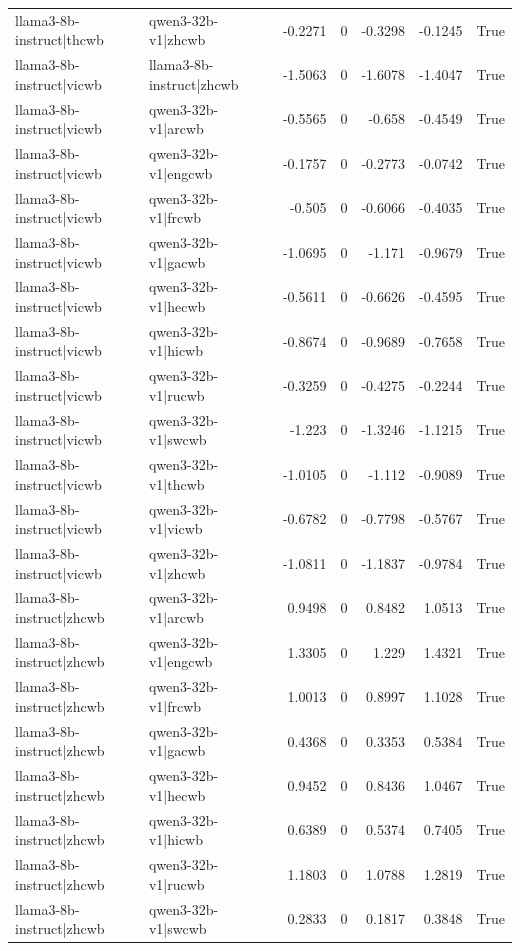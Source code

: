 \begin{table}
\begin{tabular}{l l r r r r l}
llama3-8b-instruct|thcwb & qwen3-32b-v1|zhcwb & -0.2271 & 0 & -0.3298 & -0.1245 & True \\
llama3-8b-instruct|vicwb & llama3-8b-instruct|zhcwb & -1.5063 & 0 & -1.6078 & -1.4047 & True \\
llama3-8b-instruct|vicwb & qwen3-32b-v1|arcwb & -0.5565 & 0 & -0.658 & -0.4549 & True \\
llama3-8b-instruct|vicwb & qwen3-32b-v1|engcwb & -0.1757 & 0 & -0.2773 & -0.0742 & True \\
llama3-8b-instruct|vicwb & qwen3-32b-v1|frcwb & -0.505 & 0 & -0.6066 & -0.4035 & True \\
llama3-8b-instruct|vicwb & qwen3-32b-v1|gacwb & -1.0695 & 0 & -1.171 & -0.9679 & True \\
llama3-8b-instruct|vicwb & qwen3-32b-v1|hecwb & -0.5611 & 0 & -0.6626 & -0.4595 & True \\
llama3-8b-instruct|vicwb & qwen3-32b-v1|hicwb & -0.8674 & 0 & -0.9689 & -0.7658 & True \\
llama3-8b-instruct|vicwb & qwen3-32b-v1|rucwb & -0.3259 & 0 & -0.4275 & -0.2244 & True \\
llama3-8b-instruct|vicwb & qwen3-32b-v1|swcwb & -1.223 & 0 & -1.3246 & -1.1215 & True \\
llama3-8b-instruct|vicwb & qwen3-32b-v1|thcwb & -1.0105 & 0 & -1.112 & -0.9089 & True \\
llama3-8b-instruct|vicwb & qwen3-32b-v1|vicwb & -0.6782 & 0 & -0.7798 & -0.5767 & True \\
llama3-8b-instruct|vicwb & qwen3-32b-v1|zhcwb & -1.0811 & 0 & -1.1837 & -0.9784 & True \\
llama3-8b-instruct|zhcwb & qwen3-32b-v1|arcwb & 0.9498 & 0 & 0.8482 & 1.0513 & True \\
llama3-8b-instruct|zhcwb & qwen3-32b-v1|engcwb & 1.3305 & 0 & 1.229 & 1.4321 & True \\
llama3-8b-instruct|zhcwb & qwen3-32b-v1|frcwb & 1.0013 & 0 & 0.8997 & 1.1028 & True \\
llama3-8b-instruct|zhcwb & qwen3-32b-v1|gacwb & 0.4368 & 0 & 0.3353 & 0.5384 & True \\
llama3-8b-instruct|zhcwb & qwen3-32b-v1|hecwb & 0.9452 & 0 & 0.8436 & 1.0467 & True \\
llama3-8b-instruct|zhcwb & qwen3-32b-v1|hicwb & 0.6389 & 0 & 0.5374 & 0.7405 & True \\
llama3-8b-instruct|zhcwb & qwen3-32b-v1|rucwb & 1.1803 & 0 & 1.0788 & 1.2819 & True \\
llama3-8b-instruct|zhcwb & qwen3-32b-v1|swcwb & 0.2833 & 0 & 0.1817 & 0.3848 & True \\

\end{tabular}
\end{table}
